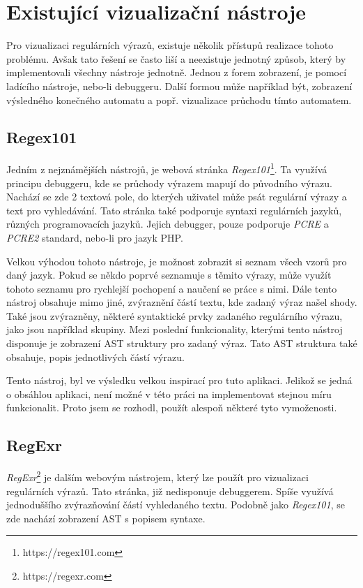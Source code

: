 \chapter{Existující vizualizační nástroje}\label{sec:ExistingApplications}

Pro vizualizaci regulárních výrazů, existuje několik přístupů realizace tohoto problému.
Avšak tato řešení se často liší a neexistuje jednotný způsob, který by implementovali všechny nástroje jednotně.
Jednou z forem zobrazení, je pomocí ladícího nástroje, nebo-li debuggeru.
Další formou může například být, zobrazení výsledného konečného automatu a popř. vizualizace průchodu tímto automatem.

\section{Regex101}

Jedním z nejznámějších nástrojů, je webová stránka \textit{Regex101}\footnote{https://regex101.com}.
Ta využívá principu debuggeru, kde se průchody výrazem mapují do původního výrazu.
Nachází se zde 2 textová pole, do kterých uživatel může psát regulární výrazy a text pro vyhledávání.
Tato stránka také podporuje syntaxi regulárních jazyků, různých programovacích jazyků.
Jejich debugger, pouze podporuje \textit{PCRE} a \textit{PCRE2} standard, nebo-li pro jazyk PHP.

Velkou výhodou tohoto nástroje, je možnost zobrazit si seznam všech vzorů pro daný jazyk.
Pokud se někdo poprvé seznamuje s těmito výrazy, může využít tohoto seznamu pro rychlejší pochopení a naučení se práce s nimi.
Dále tento nástroj obsahuje mimo jiné, zvýraznění částí textu, kde zadaný výraz našel shody.
Také jsou zvýrazněny, některé syntaktické prvky zadaného regulárního výrazu, jako jsou například skupiny.
Mezi poslední funkcionality, kterými tento nástroj disponuje je zobrazení AST struktury pro zadaný výraz.
Tato AST struktura také obsahuje, popis jednotlivých částí výrazu.

Tento nástroj, byl ve výsledku velkou inspirací pro tuto aplikaci. 
Jelikož se jedná o obsáhlou aplikaci, není možné v této práci na implementovat stejnou míru funkcionalit.
Proto jsem se rozhodl, použít alespoň některé tyto vymoženosti.

\section{RegExr}

\textit{RegExr}\footnote{https://regexr.com} je dalším webovým nástrojem, který lze použít pro vizualizaci regulárních výrazů.
Tato stránka, již nedisponuje debuggerem.
Spíše využívá jednoduššího zvýrazňování částí vyhledaného textu.
Podobně jako \textit{Regex101}, se zde nachází zobrazení AST s popisem syntaxe.

